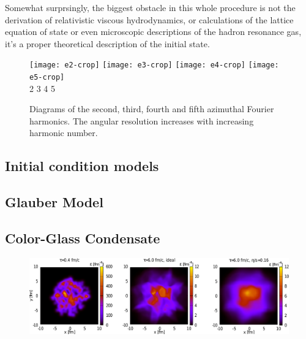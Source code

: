 \documentclass[aps,prc,reprint,amsmath,nofootinbib]{revtex4-1}
\begin{document}
Somewhat surprsingly, the biggest obstacle in this whole procedure is not the derivation of relativistic viscous hydrodynamics, or calculations of the lattice equation
of state or even microscopic descriptions of the hadron resonance gas, it's a proper theoretical description of the initial state. 

\begin{figure}[t]
 \texttt{[image: e2-crop]} \hspace{.01\columnwidth} 
 \texttt{[image: e3-crop]} \hspace{.01\columnwidth}
 \texttt{[image: e4-crop]} \hspace{.01\columnwidth}
 \texttt{[image: e5-crop]}\\
 \flushleft
 \vspace{-0.1in}
 \hspace{0.08\columnwidth} 2 \hspace{0.19\columnwidth} 3 \hspace{0.21\columnwidth} 4 \hspace{0.22\columnwidth} 5
 \caption{\label{fig:harmonics} Diagrams of the second, third, fourth and fifth azimuthal Fourier harmonics. The angular resolution increases with increasing harmonic number.}
\end{figure}

\subsection{Initial condition models}


\subsection{Glauber Model}

\subsection{Color-Glass Condensate}


\begin{figure}
 \includegraphics[width=\textwidth]{three}
\end{figure}
\end{document}

